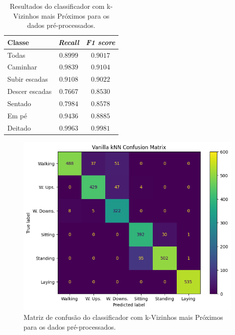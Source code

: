 \documentclass[final,5p]{elsarticle}
\numberwithin{equation}{section}
\begin{document}
        \begin{table}[h]
            \centering
            \begin{tabular}{l c c}
                \toprule
                \textbf{Classe} & \textbf{\emph{Recall}}  & \textbf{\emph{F1 score}} \\
                \midrule
                Todas & $0.8999$ & $0.9017$ \\
                \addlinespace
                Caminhar   & $0.9839$ & $0.9104$ \\
                Subir escadas   & $0.9108$ & $0.9022$ \\
                Descer escadas & $0.7667$ & $0.8530$ \\
                Sentado   & $0.7984$ & $0.8578$ \\
                Em pé  & $0.9436$ & $0.8885$ \\
                Deitado    & $0.9963$ & $0.9981$ \\
                \bottomrule
            \end{tabular}
            \caption{Resultados do classificador com k-Vizinhos mais Próximos para os dados pré-processados.}
            \label{tab:resultados_knn_vanilla_preprocessados}
        \end{table}

        \begin{figure}[hbt!]
            \includegraphics[width=0.95\columnwidth]{A_kNN_Vanilla_CM.png}
            \caption{Matriz de confusão do classificador com k-Vizinhos mais Próximos para os dados pré-processados.}
            \label{fig:cm_knn_vanilla_preprocessados}
        \end{figure}
\end{document}
